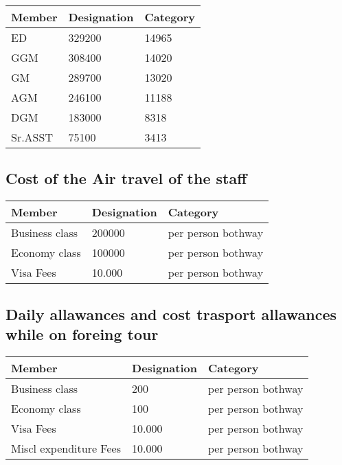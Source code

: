 \documentclass[12pt,a4paper]{article} %
\begin{document}
\par\vspace{\baselineskip}

\begin{tabular}{|l||l|l|}
\hline
Member & Designation & Category \\
\hline
ED  & 329200 & 14965 \\
GGM & 308400 & 14020 \\
GM & 289700 & 13020 \\
AGM & 246100 & 11188 \\
DGM & 183000 & 8318 \\
Sr.ASST & 75100 & 3413 \\
\hline
\end{tabular}





\subsection{Cost of the Air travel of the staff }

\par\vspace{\baselineskip}

\begin{tabular}{|l||l|l|}
\hline
Member & Designation & Category \\
\hline
Business class & 200000 & per person bothway \\
Economy  class & 100000 & per person bothway \\
Visa Fees & 10.000 & per person bothway \\

\hline
\end{tabular}



\subsection{Daily allawances and cost trasport allawances while on foreing tour }

\par\vspace{\baselineskip}

\begin{tabular}{|l||l|l|}
\hline
Member & Designation & Category \\
\hline
Business class & 200 & per person bothway \\
Economy  class & 100 & per person bothway \\
Visa Fees & 10.000 & per person bothway \\
Miscl expenditure  Fees & 10.000 & per person bothway \\
\hline
\end{tabular}
\end{document}
